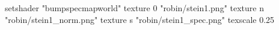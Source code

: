 setshader "bumpspecmapworld"
   texture 0 "robin/stein1.png"
   texture n "robin/stein1_norm.png"
   texture s "robin/stein1_spec.png"
texscale 0.25